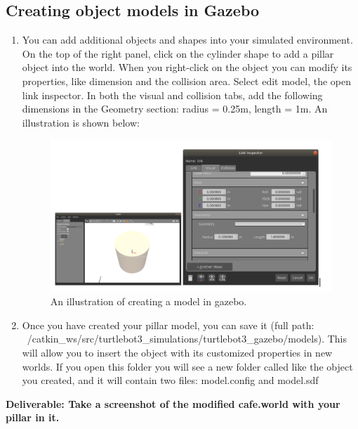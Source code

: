 \documentclass[12pt]{article}
\begin{document}
\subsection{Creating object models in Gazebo}
\begin{enumerate}
    \item You can add additional objects and shapes into your simulated environment. On the top of the right panel, click on the cylinder shape to add a pillar object into the world. When you right-click on the object you can modify its properties, like dimension and the collision area. Select edit model, the open link inspector. In both the visual and collision tabs, add the following dimensions in the Geometry section: radius = 0.25m, length = 1m. An illustration is shown below:
    
\begin{figure}[H]
  \vspace{-10pt}
  \centering\includegraphics[width=14cm]{images/lab1gazebodemo.png}\vspace{-10pt}
  \caption{An illustration of creating a model in gazebo.}\label{fig:omni1}
  \end{figure}
    
    \item Once you have created your pillar model, you can save it (full path:\\ ~/catkin\_ws/src/turtlebot3\_simulations/turtlebot3\_gazebo/models). This will allow you to insert the object with its customized properties in new worlds. If you open this folder you will see a new folder called like the object you created, and it will contain two files: model.config and model.sdf
\end{enumerate}

\textbf{Deliverable: Take a screenshot of the modified cafe.world with your pillar in it.}
\end{document}
